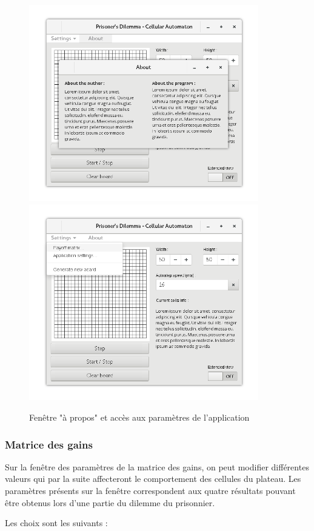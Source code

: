 \documentclass[a4paper]{article}
\begin{document}
\vfill
\begin{figure}[htp]
    \centering
    \includegraphics[width=10cm]{interface/mainviewabout.png}
    \includegraphics[width=10cm]{interface/mainviewsettings.png}
    \caption{Fenêtre "à propos" et accès aux paramètres de l'application}
\end{figure}
\vfill

\pagebreak
\subsubsection{Matrice des gains}
Sur la fenêtre des paramètres de la matrice des gains, on peut modifier différentes valeurs qui par la suite affecteront le comportement des cellules du plateau. Les paramètres présents sur la fenêtre correspondent aux quatre résultats pouvant être obtenus lors d'une partie du dilemme du prisonnier.

Les choix sont les suivants : 
\end{document}
